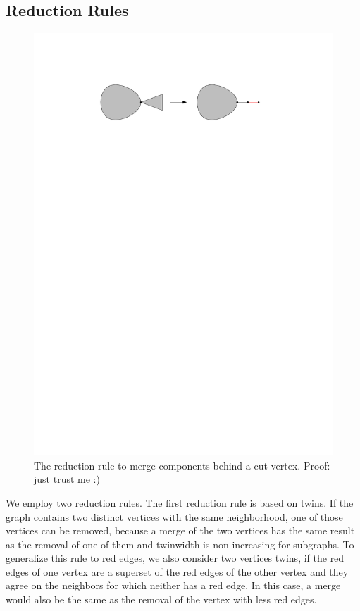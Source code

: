 \documentclass[a4paper,UKenglish,cleveref, autoref, thm-restate]{lipics-v2021}
\begin{document}
\subsection{Reduction Rules}
\begin{figure}
\centering
\includegraphics{cut}
\caption{The reduction rule to merge components behind a cut vertex. Proof: just trust me :)}
\label{fig:cut}
\end{figure}
We employ two reduction rules.
The first reduction rule is based on twins.
If the graph contains two distinct vertices with the same neighborhood, one of those vertices can be removed, because a merge of the two vertices has the same result as the removal of one of them and twinwidth is non-increasing for subgraphs.
To generalize this rule to red edges, we also consider two vertices twins, if the red edges of one vertex are a superset of the red edges of the other vertex and they agree on the neighbors for which neither has a red edge.
In this case, a merge would also be the same as the removal of the vertex with less red edges.
\end{document}
